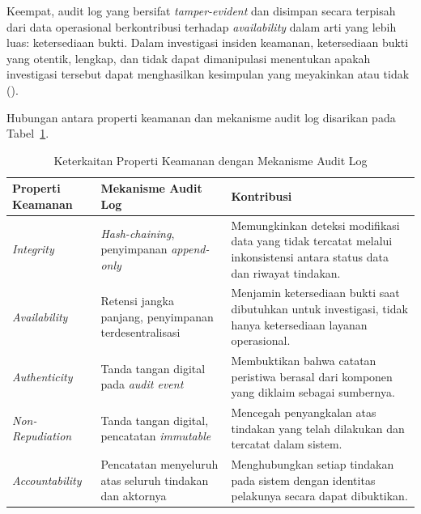 Keempat, audit log yang bersifat \textit{tamper-evident} dan disimpan
secara terpisah dari data operasional berkontribusi terhadap
\textit{availability} dalam arti yang lebih luas: ketersediaan bukti.
Dalam investigasi insiden keamanan, ketersediaan bukti yang otentik,
lengkap, dan tidak dapat dimanipulasi menentukan apakah investigasi
tersebut dapat menghasilkan kesimpulan yang meyakinkan atau tidak
(\cite{iso27789_2021}).

Hubungan antara properti keamanan dan mekanisme audit log disarikan
pada Tabel~\ref{tab:properti-audit-log}.

\begin{table}[h]
\centering
\caption{Keterkaitan Properti Keamanan dengan Mekanisme Audit Log}
\label{tab:properti-audit-log}
\begin{tabular}{|p{3cm}|p{4cm}|p{5.5cm}|}
\hline
\textbf{Properti Keamanan} & \textbf{Mekanisme Audit Log} &
\textbf{Kontribusi} \\
\hline
\textit{Integrity} &
\textit{Hash-chaining}, penyimpanan \textit{append-only} &
Memungkinkan deteksi modifikasi data yang tidak tercatat melalui
inkonsistensi antara status data dan riwayat tindakan. \\
\hline
\textit{Availability} &
Retensi jangka panjang, penyimpanan terdesentralisasi &
Menjamin ketersediaan bukti saat dibutuhkan untuk investigasi,
tidak hanya ketersediaan layanan operasional. \\
\hline
\textit{Authenticity} &
Tanda tangan digital pada \textit{audit event} &
Membuktikan bahwa catatan peristiwa berasal dari komponen yang
diklaim sebagai sumbernya. \\
\hline
\textit{Non-Repudiation} &
Tanda tangan digital, pencatatan \textit{immutable} &
Mencegah penyangkalan atas tindakan yang telah dilakukan dan
tercatat dalam sistem. \\
\hline
\textit{Accountability} &
Pencatatan menyeluruh atas seluruh tindakan dan aktornya &
Menghubungkan setiap tindakan pada sistem dengan identitas
pelakunya secara dapat dibuktikan. \\
\hline
\end{tabular}
\end{table}